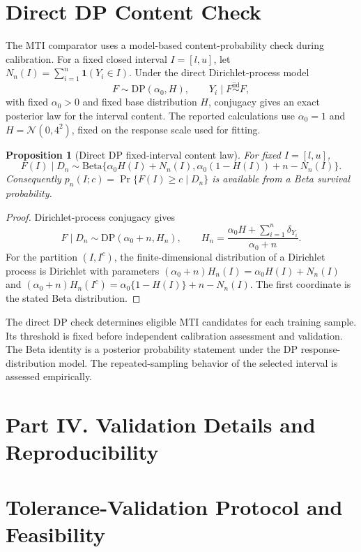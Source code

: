 \documentclass[11pt]{article}
\newcommand{\Normal}{\mathcal{N}}
\newcommand{\ind}{\mathbf{1}}
\newtheorem{proposition}{Proposition}
\begin{document}
\section{Direct DP Content Check}
\label{sec:supp-direct-dp-check}

The MTI comparator uses a model-based content-probability check during calibration.
For a fixed closed interval \(I=[l,u]\), let \(N_n(I)=\sum_{i=1}^n\ind(Y_i\in I)\).
Under the direct Dirichlet-process model
\[
F\sim\mathrm{DP}(\alpha_0,H),\qquad
Y_i\mid F\stackrel{\mathrm{iid}}{\sim}F,
\]
with fixed \(\alpha_0>0\) and fixed base distribution \(H\), conjugacy gives an exact
posterior law for the interval content. The reported calculations use
\(\alpha_0=1\) and \(H=\Normal(0,4^2)\), fixed on the response scale used for fitting.

\begin{proposition}[Direct DP fixed-interval content law]
\label{prop:supp-dp-content-law}
For fixed \(I=[l,u]\),
\[
F(I)\mid D_n\sim
\mathrm{Beta}\{\alpha_0 H(I)+N_n(I),\alpha_0(1-H(I))+n-N_n(I)\}.
\]
Consequently \(p_n(I;c)=\Pr\{F(I)\ge c\mid D_n\}\) is available from a Beta
survival probability.
\end{proposition}

\begin{proof}
Dirichlet-process conjugacy gives
\[
F\mid D_n\sim \mathrm{DP}(\alpha_0+n,H_n),\qquad
H_n=\frac{\alpha_0 H+\sum_{i=1}^n\delta_{Y_i}}{\alpha_0+n}.
\]
For the partition \((I,I^c)\), the finite-dimensional distribution of a
Dirichlet process is Dirichlet with parameters
\((\alpha_0+n)H_n(I)=\alpha_0 H(I)+N_n(I)\) and
\((\alpha_0+n)H_n(I^c)=\alpha_0\{1-H(I)\}+n-N_n(I)\). The first coordinate is the stated
Beta distribution.
\end{proof}

The direct DP check determines eligible MTI candidates for each training
sample. Its threshold is fixed before independent calibration assessment
and validation. The Beta identity is a posterior probability statement
under the DP response-distribution model. The repeated-sampling behavior of
the selected interval is assessed empirically.

\section*{Part IV. Validation Details and Reproducibility}

\section{Tolerance-Validation Protocol and Feasibility}
\label{sec:supp-tolerance-validation-protocol}
\end{document}
